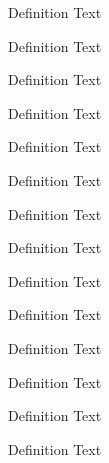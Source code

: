 \begin{definition}[Title]
\label{def:def1}
Definition Text
\end{definition}

\begin{definition}[Title]
\label{def:def1}
Definition Text
\end{definition}

\begin{definition}[Title]
\label{def:def1}
Definition Text
\end{definition}

\begin{definition}[Title]
\label{def:def1}
Definition Text
\end{definition}

\begin{definition}[Title]
\label{def:def1}
Definition Text
\end{definition}

\begin{definition}[Title]
\label{def:def1}
Definition Text
\end{definition}

\begin{definition}[Title]
\label{def:def1}
Definition Text
\end{definition}

\begin{definition}[Title]
\label{def:def1}
Definition Text
\end{definition}

\begin{definition}[Title]
\label{def:def1}
Definition Text
\end{definition}

\begin{definition}[Title]
\label{def:def1}
Definition Text
\end{definition}

\begin{definition}[Title]
\label{def:def1}
Definition Text
\end{definition}

\begin{definition}[Title]
\label{def:def1}
Definition Text
\end{definition}

\begin{definition}[Title]
\label{def:def1}
Definition Text
\end{definition}

\begin{definition}[Title]
\label{def:def1}
Definition Text
\end{definition}

